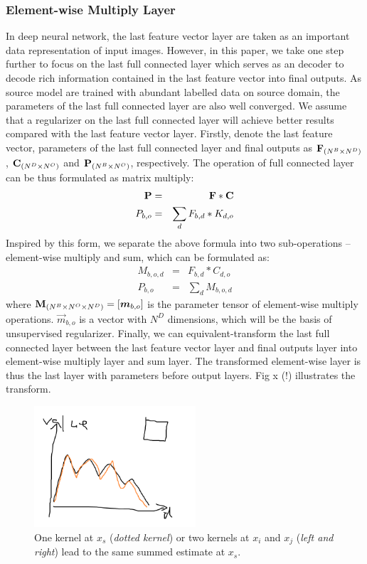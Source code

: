 \documentclass[runningheads]{llncs}
\begin{document}
\subsubsection{Element-wise Multiply Layer}
\label{section:Element-wise Multiply Layer}
In deep neural network, the last feature vector layer are taken as an important data representation of input images. However, in this paper, we take one step further to focus on the last full connected layer which serves as an decoder to decode rich information contained in the last feature vector into final outputs. As source model are trained with abundant labelled data on source domain, the parameters of the last full connected layer are also well converged. We assume that a regularizer on the last full connected layer will achieve better results compared with the last feature vector layer. Firstly, denote the last feature vector, parameters of the last full connected layer and final outputs as ${\bf F}_{(N^{B}\times N^{D})}$, ${\bf C}_{(N^{D}\times N^{O})}$ and ${\bf P}_{(N^{B}\times N^{O})}$, respectively. The operation of full connected layer can be thus formulated as matrix multiply:
\begin{eqnarray}
  {\bf P} &=& {\bf F}*{\bf C} \\
  P_{b,o} &=&  \sum_{d}{F_{b,d}*K_{d,o}}
\end{eqnarray}
Inspired by this form, we separate the above formula into two sub-operations -- element-wise multiply and sum, which can be formulated as:
\begin{eqnarray}
  M_{b,o,d} &=& F_{b,d} * C_{d,o} \\
  P_{b,o} &=& \sum_{d}{M_{b,o,d}}
\end{eqnarray}
where ${\bf M}_{(N^{B}\times N^{O}\times N^{D})} = [\vec{m}_{b,o}]$ is the parameter tensor of element-wise multiply operations. $\vec{m}_{b,o}$ is a vector with $N^{D}$ dimensions, which will be the basis of unsupervised regularizer. Finally, we can equivalent-transform the last full connected layer between the last feature vector layer and final outputs layer into element-wise multiply layer and sum layer. The transformed element-wise layer is thus the last layer with parameters before output layers. Fig x (!) illustrates the transform.

\begin{figure}
\centering
\includegraphics[height=4.5cm]{images/mmd.png}
\caption{One kernel at $x_s$ ({\it dotted kernel}) or two kernels at
$x_i$ and $x_j$ ({\it left and right}) lead to the same summed estimate
at $x_s$. }
\label{fig:example}
\end{figure}
\end{document}
